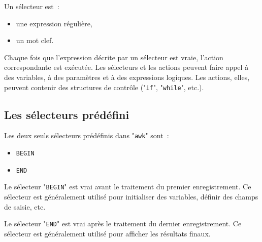 Un s{\'e}lecteur est~:
\begin{itemize}
	\item	une expression r{\'e}guli{\`e}re,
	\item	un mot clef.
\end{itemize}

Chaque fois que l'expression d{\'e}crite par un s{\'e}lecteur est vraie, l'action cor\-res\-pon\-dante est ex{\'e}cut{\'e}e. Les s{\'e}lecteurs et les actions peuvent faire appel {\`a} des variables, {\`a} des param{\`e}tres et {\`a} des expressions logiques. Les actions, elles, peuvent contenir des structures de contr{\^o}le ("\texttt{if}", "\texttt{while}", etc.).

\subsection{Les s{\'e}lecteurs pr{\'e}d{\'e}fini}

Les deux seuls s{\'e}lecteurs pr{\'e}d{\'e}finis dans "\texttt{awk}" sont~:
\begin{itemize}
	\item	{}\texttt{BEGIN}
	\item	{}\texttt{END}
\end{itemize}

Le s{\'e}lecteur "\texttt{BEGIN}" est vrai avant le traitement du premier
enregistrement. Ce s{\'e}lecteur est g{\'e}n{\'e}ralement utilis{\'e} pour initialiser des variables, d{\'e}finir des champs de saisie, etc.

Le s{\'e}lecteur "\texttt{END}" est vrai apr{\`e}s le traitement du dernier enregistrement. Ce s{\'e}lecteur est g{\'e}n{\'e}ralement utilis{\'e} pour afficher les r{\'e}sultats finaux.

